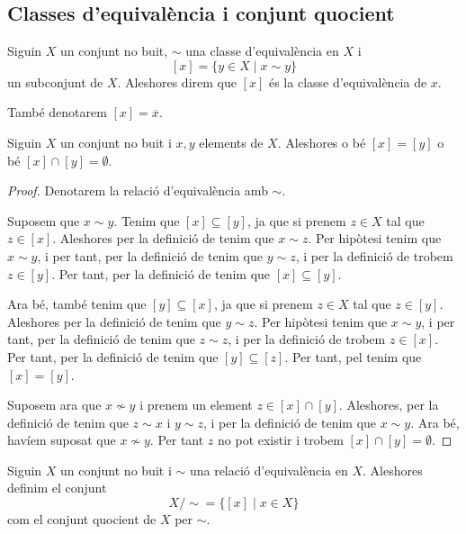 \documentclass[../Apunts.tex]{subfiles}
\begin{document}
	\subsection{Classes d'equivalència i conjunt quocient}
	\begin{definition}
		\label{def:classe d'equivalència}
		Siguin \(X\) un conjunt no buit, \(\sim\) una classe d'equivalència en \(X\) i
		\[[x]=\{y\in X\mid x\sim y\}\]
		un subconjunt de \(X\). Aleshores direm que \([x]\) és la classe d'equivalència de \(x\).
		
		També denotarem \([x]=\overline{x}\).
	\end{definition}
	\begin{proposition}
		Siguin \(X\) un conjunt no buit i \(x,y\) elements de \(X\). Aleshores o bé \([x]=[y]\) o bé \([x]\cap[y]=\emptyset\).
		\begin{proof}
			Denotarem la relació d'equivalència amb \(\sim\).
			
			Suposem que \(x\sim y\). Tenim que \([x]\subseteq[y]\), ja que si prenem \(z\in X\) tal que \(z\in[x]\). Aleshores per la definició de  tenim que \(x\sim z\). Per hipòtesi tenim que \(x\sim y\), i per tant, per la definició de  tenim que \(y\sim z\), i per la definició de  trobem \(z\in[y]\). Per tant, per la definició de  tenim que \([x]\subseteq[y]\).
			
			Ara bé, també tenim que \([y]\subseteq[x]\), ja que si prenem \(z\in X\) tal que \(z\in[y]\). Aleshores per la definició de  tenim que \(y\sim z\). Per hipòtesi tenim que \(x\sim y\), i per tant, per la definició de  tenim que \(z\sim z\), i per la definició de  trobem \(z\in[x]\). Per tant, per la definició de  tenim que \([y]\subseteq[z]\). Per tant, pel  tenim que \([x]=[y]\).
			
			Suposem ara que \(x\nsim y\) i prenem un element \(z\in[x]\cap[y]\). Aleshores, per la definició de  tenim que \(z\sim x\) i \(y\sim z\), i per la definició de  tenim que \(x\sim y\). Ara bé, havíem suposat que \(x\nsim y\). Per tant \(z\) no pot existir i trobem \([x]\cap[y]=\emptyset\).
		\end{proof}
	\end{proposition}
	\begin{definition}
		\label{def:conjunt quocient}
		Siguin \(X\) un conjunt no buit i \(\sim\) una relació d'equivalència en \(X\). Aleshores definim el conjunt
		\[X/\sim=\{[x]\mid x\in X\}\]
		com el conjunt quocient de \(X\) per \(\sim\).
	\end{definition}
\end{document}
